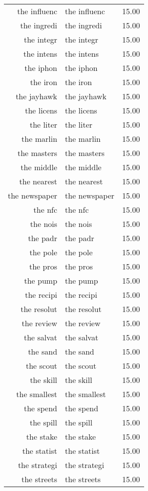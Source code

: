 \begin{table}[ht]
\begin{tabular}{rlr}
  the influenc & the influenc & 15.00 \\ 
  the ingredi & the ingredi & 15.00 \\ 
  the integr & the integr & 15.00 \\ 
  the intens & the intens & 15.00 \\ 
  the iphon & the iphon & 15.00 \\ 
  the iron & the iron & 15.00 \\ 
  the jayhawk & the jayhawk & 15.00 \\ 
  the licens & the licens & 15.00 \\ 
  the liter & the liter & 15.00 \\ 
  the marlin & the marlin & 15.00 \\ 
  the masters & the masters & 15.00 \\ 
  the middle & the middle & 15.00 \\ 
  the nearest & the nearest & 15.00 \\ 
  the newspaper & the newspaper & 15.00 \\ 
  the nfc & the nfc & 15.00 \\ 
  the nois & the nois & 15.00 \\ 
  the padr & the padr & 15.00 \\ 
  the pole & the pole & 15.00 \\ 
  the pros & the pros & 15.00 \\ 
  the pump & the pump & 15.00 \\ 
  the recipi & the recipi & 15.00 \\ 
  the resolut & the resolut & 15.00 \\ 
  the review & the review & 15.00 \\ 
  the salvat & the salvat & 15.00 \\ 
  the sand & the sand & 15.00 \\ 
  the scout & the scout & 15.00 \\ 
  the skill & the skill & 15.00 \\ 
  the smallest & the smallest & 15.00 \\ 
  the spend & the spend & 15.00 \\ 
  the spill & the spill & 15.00 \\ 
  the stake & the stake & 15.00 \\ 
  the statist & the statist & 15.00 \\ 
  the strategi & the strategi & 15.00 \\ 
  the streets & the streets & 15.00 \\ 

\end{tabular}
\end{table}

